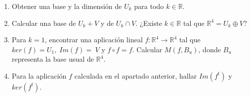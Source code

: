 \documentclass[12pt]{article}
\begin{document}
\begin{enumerate}
    \begin{enumerate}
        \item Obtener una base y la dimensión de $U_k$ para todo $k\in \mathbb{R}$.

        \item Calcular una base de $U_k + V$ y de $U_k \cap V$. ¿Existe $k\in \mathbb{R}$ tal que $\mathbb{R}^4= U_k \oplus V$?

        \item Para $k=1$, encontrar una aplicación lineal $f:\mathbb{R}^4\to \mathbb{R}^4$ tal que $ker(f) = U_1,\;Im(f)=~V$ y $f \circ f = f$. Calcular $M(f, B_u)$, donde $B_u$ representa la base usual de $\mathbb{R}^4$.

        \item Para la aplicación $f$ calculada en el apartado anterior, hallar $Im(f^t)$ y $ker(f^t)$.
    \end{enumerate}

    
\end{enumerate}
\end{document}
